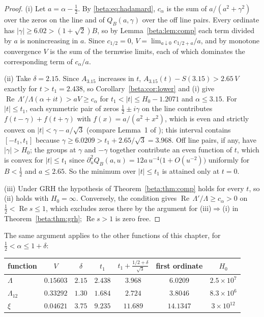\begin{proof}
(i) Let $a=\alpha-\tfrac12$. By \eqref{beta:eq:hadamard}, $c_\alpha$ is the sum of $a/(a^2+\gamma^2)$ over the zeros on the line and of $Q_B(a,\gamma)$ over the off line pairs. Every ordinate has $|\gamma|\ge6.02>(1+\sqrt2)B$, so by Lemma~\ref{beta:lem:comp} each term divided by $a$ is nonincreasing in $a$. Since $c_{1/2}=0$, $V=\lim_{a\downarrow0}c_{1/2+a}/a$, and by monotone convergence $V$ is the sum of the termwise limits, each of which dominates the corresponding term of $c_\alpha/a$.

(ii) Take $\delta=2.15$. Since $A_{3.15}$ increases in $t$, $A_{3.15}(t)-S(3.15)>2.65\,V$ exactly for $t>t_1=2.438$, so Corollary~\ref{beta:cor:lower} and (i) give $\operatorname{Re}\,\Lambda'/\Lambda(\alpha+it)>aV\ge c_\alpha$ for $t_1<|t|\le H_0-1.2071$ and $\alpha\le3.15$. For $|t|\le t_1$, each symmetric pair of zeros $\tfrac12\pm i\gamma$ on the line contributes $f(t-\gamma)+f(t+\gamma)$ with $f(x)=a/(a^2+x^2)$, which is even and strictly convex on $|t|<\gamma-a/\sqrt3$ (compare Lemma~1 of \cite{garunkstis2000}); this interval contains $[-t_1,t_1]$ because $\gamma\ge6.0209>t_1+2.65/\sqrt3=3.968$. Off line pairs, if any, have $|\gamma|>H_0$; the groups at $\gamma$ and $-\gamma$ together contribute an even function of $t$, which is convex for $|t|\le t_1$ since $\partial_u^2Q_B(a,u)=12a\,u^{-4}\bigl(1+O(u^{-2})\bigr)$ uniformly for $B<\tfrac12$ and $a\le2.65$. So the minimum over $|t|\le t_1$ is attained only at $t=0$.

(iii) Under GRH the hypothesis of Theorem~\ref{beta:thm:comp} holds for every $t$, so (ii) holds with $H_0=\infty$. Conversely, the condition gives $\operatorname{Re}\,\Lambda'/\Lambda\ge c_\alpha>0$ on $\tfrac12<\operatorname{Re} s\le1$, which excludes zeros there by the argument for (iii)$\Rightarrow$(i) in Theorem~\ref{beta:thm:grh}; $\operatorname{Re} s>1$ is zero free.
\end{proof}

The same argument applies to the other functions of this chapter, for $\tfrac12<\alpha\le1+\delta$:

\begin{center}
\begin{tabular}{lcccccc}
\toprule
function & $V$ & $\delta$ & $t_1$ & $t_1+\frac{1/2+\delta}{\sqrt3}$ & first ordinate & $H_0$\\
\midrule
$\Lambda$ & $0.15603$ & $2.15$ & $2.438$ & $3.968$ & $6.0209$ & $2.5\times10^7$\\
$\Lambda_{12}$ & $0.33292$ & $1.30$ & $1.684$ & $2.724$ & $3.8046$ & $8.3\times10^6$\\
$\xi$ & $0.04621$ & $3.75$ & $9.235$ & $11.689$ & $14.1347$ & $3\times10^{12}$\\
\bottomrule
\end{tabular}
\end{center}

